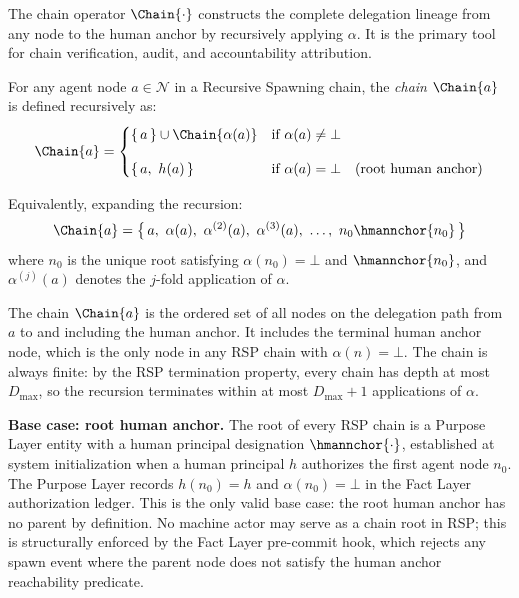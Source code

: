 The chain operator $\Chain{\cdot}$ constructs the complete delegation lineage from any node to the human anchor by recursively applying $\alpha$. It is the primary tool for chain verification, audit, and accountability attribution.

\begin{dfn}
\label{def:chain-operator}
For any agent node $a \in \mathcal{N}$ in a Recursive Spawning chain, the \emph{chain} $\Chain{a}$ is defined recursively as:
\begin{equation}
\Chain{a} =
\begin{cases}
\{\, a\,\} \cup \Chain{\alpha(a)} & \text{if } \alpha(a) \neq \bot \\[10pt]
\{\, a,\ h(a) \,\} & \text{if } \alpha(a) = \bot \quad \text{(root human anchor)}
\end{cases}
\label{eq:chain-operator}
\end{equation}

Equivalently, expanding the recursion:
\begin{equation}
\Chain{a} = \bigl\{\, a,\ \alpha(a),\ \alpha^{(2)}(a),\ \alpha^{(3)}(a),\ \ldots,\ n_0 \hmannchor{n_0} \,\bigr\}
\label{eq:chain-expanded}
\end{equation}
where $n_0$ is the unique root satisfying $\alpha(n_0) = \bot$ and $\hmannchor{n_0}$, and $\alpha^{(j)}(a)$ denotes the $j$-fold application of $\alpha$.
\end{dfn}

The chain $\Chain{a}$ is the ordered set of all nodes on the delegation path from $a$ to and including the human anchor. It includes the terminal human anchor node, which is the only node in any RSP chain with $\alpha(n) = \bot$. The chain is always finite: by the RSP termination property, every chain has depth at most $D_{\max}$, so the recursion terminates within at most $D_{\max} + 1$ applications of $\alpha$.

\medskip
\noindent\textbf{Base case: root human anchor.} The root of every RSP chain is a Purpose Layer entity with a human principal designation $\hmannchor{\cdot}$, established at system initialization when a human principal $h$ authorizes the first agent node $n_0$. The Purpose Layer records $h(n_0) = h$ and $\alpha(n_0) = \bot$ in the Fact Layer authorization ledger. This is the only valid base case: the root human anchor has no parent by definition. No machine actor may serve as a chain root in RSP; this is structurally enforced by the Fact Layer pre-commit hook, which rejects any spawn event where the parent node does not satisfy the human anchor reachability predicate.

